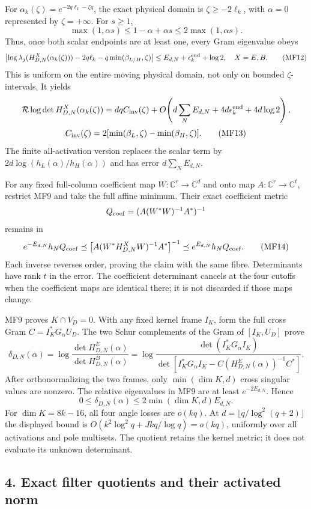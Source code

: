 \documentclass[11pt]{article}
\begin{document}
For \(\alpha_k(\zeta)=e^{-2q\ell_k-\zeta q}\), the exact physical domain is \(\zeta\ge-2\ell_k\), with \(\alpha=0\) represented by \(\zeta=+\infty\). For \(s\ge1\), \[
\max(1,\alpha s)\le1-\alpha+\alpha s\le2\max(1,\alpha s).
\] Thus, once both scalar endpoints are at least one, every Gram eigenvalue obeys \[
\left|\log\lambda_j(H^X_{D,N}(\alpha_k(\zeta)))
-2q\ell_k-q\min(\beta_{L/H},\zeta)\right|
\le E_{d,N}+\epsilon_k^{\rm end}+\log2,\quad X=E,B.
\tag{MF12}
\] This is uniform on the entire moving physical domain, not only on bounded \(\zeta\)-intervals. It yields \[
\mathcal R\log\det H^X_{D,N}(\alpha_k(\zeta))
=dq C_{\rm inv}(\zeta)+O\!\left(d\sum_NE_{d,N}
 +4d\epsilon_k^{\rm end}+4d\log2\right),
\] \[
C_{\rm inv}(\zeta)=2[\min(\beta_L,\zeta)-\min(\beta_H,\zeta)].
\tag{MF13}
\] The finite all-activation version replaces the scalar term by \(2d\log(h_L(\alpha)/h_H(\alpha))\) and has error \(d\sum_NE_{d,N}\).

For any fixed full-column coefficient map \(W:\mathbb C^r\to\mathbb C^d\) and onto map \(A:\mathbb C^r\to\mathbb C^t\), restrict MF9 and take the full affine minimum. Their exact coefficient metric \[
Q_{\rm coef}=(A(W^*W)^{-1}A^*)^{-1}
\] remains in \[
e^{-E_{d,N}}h_NQ_{\rm coef}\preceq
\left[A(W^*H^X_{D,N}W)^{-1}A^*\right]^{-1}
\preceq e^{E_{d,N}}h_NQ_{\rm coef}.
\tag{MF14}
\] Each inverse reverses order, proving the claim with the same fibre. Determinants have rank \(t\) in the error. The coefficient determinant cancels at the four cutoffs when the coefficient maps are identical there; it is not discarded if those maps change.

MF9 proves \(K\cap V_D=0\). With any fixed kernel frame \(I_K\), form the full cross Gram \(C=I_K^*G_\alpha U_D\). The two Schur complements of the Gram of \([I_K,U_D]\) prove \[
\delta_{D,N}(\alpha)=
\log\frac{\det H^E_{D,N}(\alpha)}{\det H^B_{D,N}(\alpha)}
=\log\frac{\det(I_K^*G_\alpha I_K)}
{\det[I_K^*G_\alpha I_K-C(H^E_{D,N}(\alpha))^{-1}C^*]}.
\tag{MF15}
\] After orthonormalizing the two frames, only \(\min(\dim K,d)\) cross singular values are nonzero. The relative eigenvalues in MF9 are at least \(e^{-2E_{d,N}}\). Hence \[
0\le\delta_{D,N}(\alpha)\le2\min(\dim K,d)E_{d,N}.
\tag{MF16}
\] For \(\dim K=8k-16\), all four angle losses are \(o(kq)\). At \(d=\lfloor q/\log^2(q+2)\rfloor\) the displayed bound is \(O(k^2\log^2q+Jkq/\log q)=o(kq)\), uniformly over all activations and pole multisets. The quotient retains the kernel metric; it does not evaluate its unknown determinant.

\subsection{4. Exact filter quotients and their activated norm}\label{exact-filter-quotients-and-their-activated-norm}
\end{document}
